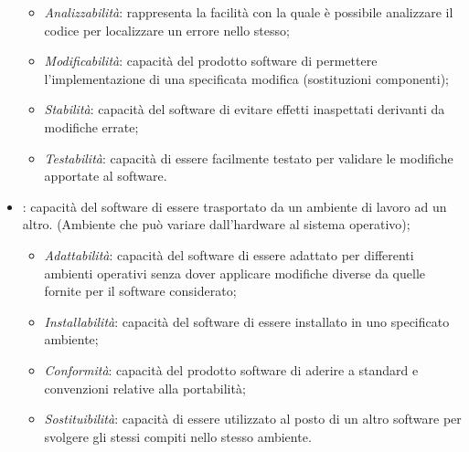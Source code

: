 \begin{itemize}
\begin{itemize}
\item \emph{Analizzabilità}: rappresenta la facilità con la quale è possibile analizzare il codice per localizzare un errore nello stesso;
\item \emph{Modificabilità}: capacità del prodotto software di permettere l'implementazione di una specificata modifica (sostituzioni componenti);
\item \emph{Stabilità}: capacità del software di evitare effetti inaspettati derivanti da modifiche errate;
\item \emph{Testabilità}: capacità di essere facilmente testato per validare le modifiche apportate al software.
\end{itemize}
\item {}: capacità del software di essere trasportato da un ambiente di lavoro ad un altro. (Ambiente che può variare dall'hardware al sistema operativo);
\begin{itemize}
\item \emph{Adattabilità}: capacità del software di essere adattato per differenti ambienti operativi senza dover applicare modifiche diverse da quelle fornite per il software considerato;
\item \emph{Installabilità}: capacità del software di essere installato in uno specificato ambiente;
\item \emph{Conformità}: capacità del prodotto software di aderire a standard e convenzioni relative alla portabilità;
\item \emph{Sostituibilità}: capacità di essere utilizzato al posto di un altro software per svolgere gli stessi compiti nello stesso ambiente.
\end{itemize}
\end{itemize}




